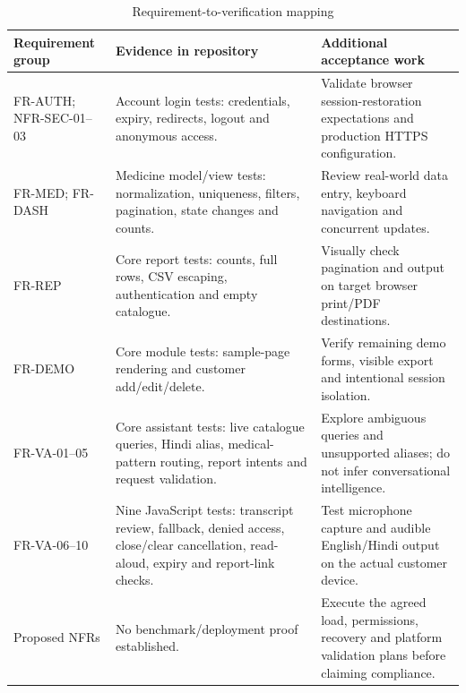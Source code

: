 \documentclass{article}
\begin{document}
\begin{table}[H]
\centering\small
\caption{Requirement-to-verification mapping}
\begin{tabularx}{\textwidth}{L{39mm}L{49mm}Y}
\toprule Requirement group & Evidence in repository & Additional acceptance work\\\midrule
FR-AUTH; NFR-SEC-01--03 & Account login tests: credentials, expiry, redirects, logout and anonymous access. & Validate browser session-restoration expectations and production HTTPS configuration.\\
FR-MED; FR-DASH & Medicine model/view tests: normalization, uniqueness, filters, pagination, state changes and counts. & Review real-world data entry, keyboard navigation and concurrent updates.\\
FR-REP & Core report tests: counts, full rows, CSV escaping, authentication and empty catalogue. & Visually check pagination and output on target browser print/PDF destinations.\\
FR-DEMO & Core module tests: sample-page rendering and customer add/edit/delete. & Verify remaining demo forms, visible export and intentional session isolation.\\
FR-VA-01--05 & Core assistant tests: live catalogue queries, Hindi alias, medical-pattern routing, report intents and request validation. & Explore ambiguous queries and unsupported aliases; do not infer conversational intelligence.\\
FR-VA-06--10 & Nine JavaScript tests: transcript review, fallback, denied access, close/clear cancellation, read-aloud, expiry and report-link checks. & Test microphone capture and audible English/Hindi output on the actual customer device.\\
Proposed NFRs & No benchmark/deployment proof established. & Execute the agreed load, permissions, recovery and platform validation plans before claiming compliance.\\
\bottomrule
\end{tabularx}
\end{table}
\end{document}
